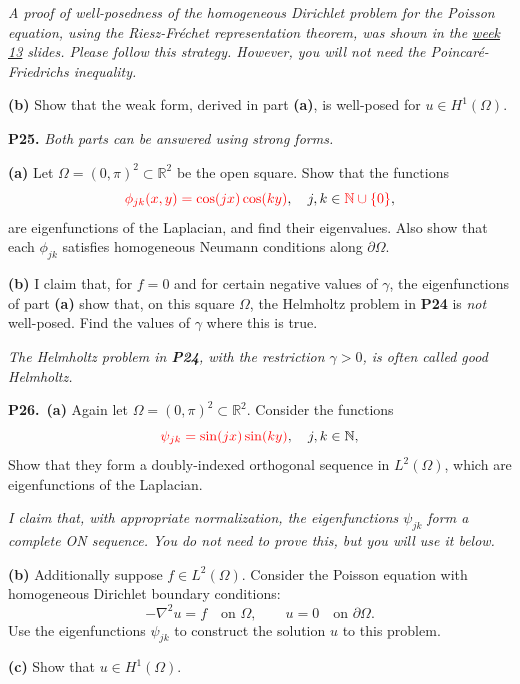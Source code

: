 \documentclass[12pt]{amsart}
\newcommand{\NN}{\mathbb{N}}
\newcommand{\RR}{\mathbb{R}}
\newcommand{\grad}{\nabla}
\newcommand{\prob}[1]{\bigskip\noindent\textbf{#1.}\quad }
\newcommand{\epart}[1]{\medskip\noindent\textbf{(#1)}\quad }
\newcommand{\ppart}[1]{\,\textbf{(#1)}\quad }
\begin{document}
\medskip \noindent \emph{A proof of well-posedness of the homogeneous Dirichlet problem for the Poisson equation, using the Riesz-Fr\'echet representation theorem, was shown in the \href{https://bueler.github.io/fa/assets/slides/S26/week13.pdf}{week 13} slides.  Please follow this strategy.  However, you will \emph{not} need the Poincaré-Friedrichs inequality.}

\epart{b} Show that the weak form, derived in part \textbf{(a)}, is well-posed for $u\in H^1(\Omega)$.


\prob{P25}  \emph{Both parts can be answered using strong forms.}

\epart{a}  Let $\Omega=(0,\pi)^2\subset \RR^2$ be the open square.  Show that the functions
	$${\color{red} \phi_{jk}(x,y) = \cos(j x) \cos(k y)}, \quad j,k \in {\color{red} \NN \cup \{0\}},$$
are eigenfunctions of the Laplacian, and find their eigenvalues.  Also show that each $\phi_{jk}$ satisfies homogeneous {\color{red} Neumann} conditions along $\partial\Omega$.

\epart{b}  I claim that, for $f=0$ and for certain negative values of $\gamma$, the eigenfunctions of part \textbf{(a)} show that, on this square $\Omega$, the Helmholtz problem in \textbf{P24} is \emph{not} well-posed.  {\color{red} Find the values of $\gamma$ where this is true.}

\medskip \noindent \emph{The Helmholtz problem in \emph{\textbf{P24}}, with the restriction $\gamma>0$, is often called \emph{good Helmholtz}.}


\prob{P26}  \ppart{a}  Again let $\Omega=(0,\pi)^2\subset \RR^2$.  Consider the functions
    $${\color{red} \psi_{jk} = \sin(j x) \sin(k y)}, \quad j,k \in \NN,$$
Show that they form a doubly-indexed {\color{red} orthogonal} sequence in $L^2(\Omega)$, {\color{red} which are eigenfunctions of the Laplacian}.

\medskip \noindent \emph{I claim that, with appropriate normalization, the eigenfunctions {\color{red} $\psi_{jk}$} form a complete ON sequence.  You do not need to prove this, but you will use it below.}

\epart{b}  Additionally suppose $f\in L^2(\Omega)$.  Consider the Poisson equation with homogeneous Dirichlet boundary conditions:
	$$-\grad^2 u = f \quad \text{on } \Omega, \qquad u=0 \quad \text{on } \partial\Omega.$$
Use the eigenfunctions {\color{red} $\psi_{jk}$} to construct the solution $u$ to this problem.

\epart{c}  Show that $u\in H^1(\Omega)$.
\end{document}
